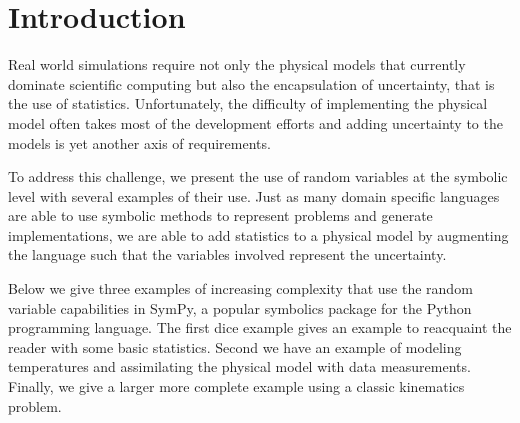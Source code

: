 \section{Introduction}

Real world simulations require not only the physical models that currently
dominate scientific computing but also the encapsulation of uncertainty, that
is the use of statistics.  Unfortunately, the difficulty of implementing the
physical model often takes most of the development efforts and adding
uncertainty to the models is yet another axis of requirements.

To address this challenge, we present the use of random variables at the
symbolic level with several examples of their use.  Just as many domain
specific languages are able to use symbolic methods to represent problems and
generate implementations, we are able to add statistics to a physical model by
augmenting the language such that the variables involved represent the
uncertainty.

Below we give three examples of increasing complexity that use the random
variable capabilities in SymPy, a popular symbolics package for the Python
programming language.  The first dice example gives an example to reacquaint the
reader with some basic statistics.  Second we have an example of modeling
temperatures and assimilating the physical model with data
measurements. Finally, we give a larger more complete example using a classic
kinematics problem.
